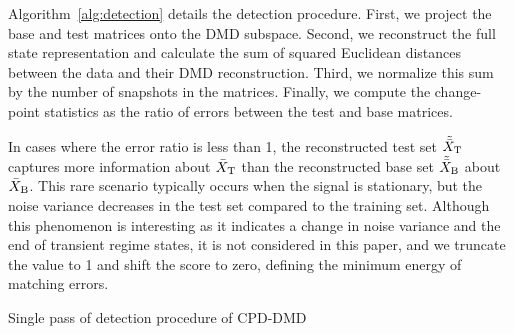 Algorithm~\ref{alg:detection} details the detection procedure. First, we project the base and test matrices onto the DMD subspace. Second, we reconstruct the full state representation and calculate the sum of squared Euclidean distances between the data and their DMD reconstruction. Third, we normalize this sum by the number of snapshots in the matrices. Finally, we compute the change-point statistics as the ratio of errors between the test and base matrices.

In cases where the error ratio is less than 1, the reconstructed test set \(\tilde{\bar{X}} _{\text{T}}\) captures more information about \(\bar{X} _{\text{T}}\) than the reconstructed base set \(\tilde{\bar{X}} _{\text{B}}\) about \(\bar{X} _{\text{B}}\). This rare scenario typically occurs when the signal is stationary, but the noise variance decreases in the test set compared to the training set. Although this phenomenon is interesting as it indicates a change in noise variance and the end of transient regime states, it is not considered in this paper, and we truncate the value to 1 and shift the score to zero, defining the minimum energy of matching errors.

\begin{algorithm}
	\caption{Single pass of detection procedure of CPD-DMD}\label{alg:detection}
	\begin{algorithmic}[1]
	\end{algorithmic}
\end{algorithm}



